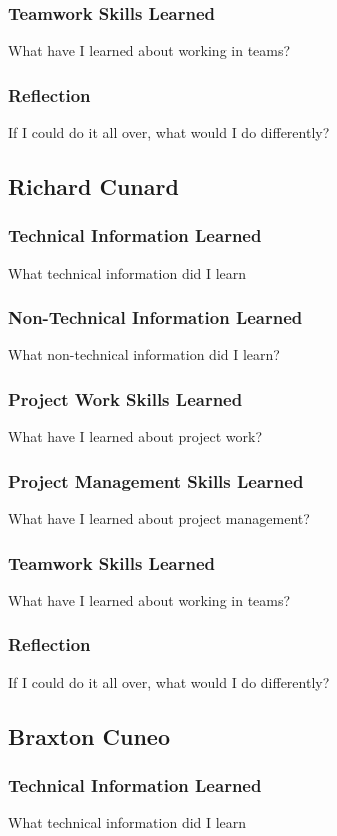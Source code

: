 \documentclass[onecolumn, draftclsnofoot,10pt, compsoc]{IEEEtran}
\begin{document}
\subsubsection{Teamwork Skills Learned}
What have I learned about working in teams?
\subsubsection{Reflection}
If I could do it all over, what would I do differently?


\subsection{Richard Cunard}

\subsubsection{Technical Information Learned}
What technical information did I learn
\subsubsection{Non-Technical Information Learned}
What non-technical information did I learn?
\subsubsection{Project Work Skills Learned}
What have I learned about project work?
\subsubsection{Project Management Skills Learned}
What have I learned about project management?
\subsubsection{Teamwork Skills Learned}
What have I learned about working in teams?
\subsubsection{Reflection}
If I could do it all over, what would I do differently?


\subsection{Braxton Cuneo}

\subsubsection{Technical Information Learned}
What technical information did I learn
\end{document}
